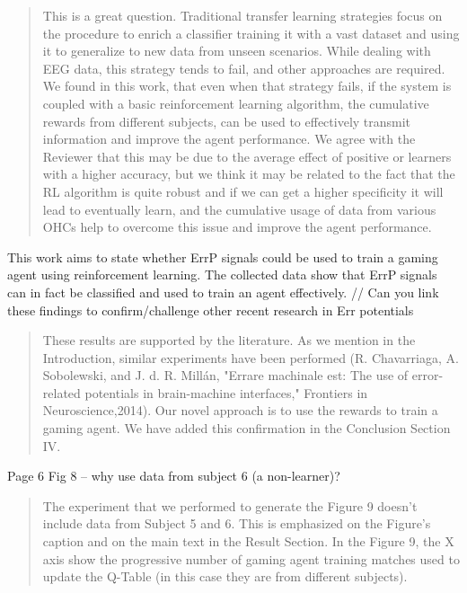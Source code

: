 \documentclass[journal,onecolumn,12pt]{IEEEtran}
\begin{document}
\begin{quotation}
{\color{blue}
This is a great question.  Traditional transfer learning strategies focus on the procedure to enrich a classifier training it with a vast dataset and using it to generalize to new data from unseen scenarios.  While dealing with EEG data, this strategy tends to fail, and other approaches are required.  We found in this work, that even when that strategy fails, if the system is coupled with a basic reinforcement learning algorithm, the cumulative rewards from different subjects, can be used to effectively transmit information and improve the agent performance.  We agree with the Reviewer that this may be due to the average effect of positive or learners with a higher accuracy, but we think it may be related to the fact that the RL algorithm is quite robust and if we can get a higher specificity it will lead to eventually learn, and the cumulative usage of data from various OHCs help to overcome this issue and improve the agent performance.
}
\end{quotation}

This work aims to state whether ErrP signals could be used to train a gaming agent using reinforcement learning. The collected data show that ErrP signals can in fact be classified and used to train an agent effectively. // Can you link these findings to confirm/challenge other recent research in Err potentials

\begin{quotation}
{\color{blue}

These results are supported by the literature. As we mention in the Introduction, similar experiments have been performed (R. Chavarriaga, A. Sobolewski, and J. d. R. Millán, "Errare machinale est: The use of error-related potentials in brain-machine interfaces," Frontiers in Neuroscience,2014).  Our novel approach is to use the rewards to train a gaming agent. 
We have added this confirmation in the Conclusion Section IV.
}
\end{quotation}

Page 6
Fig 8 – why use data from subject 6 (a non-learner)?

\begin{quotation}
{\color{blue}
The experiment that we performed to generate the Figure 9 doesn't include data from Subject 5 and 6. This is emphasized on the Figure's caption and on the main text in the Result Section.  In the Figure 9, the X axis show the progressive number of gaming agent training matches used to update the Q-Table (in this case they are from different subjects).
}
\end{quotation}
\end{document}
